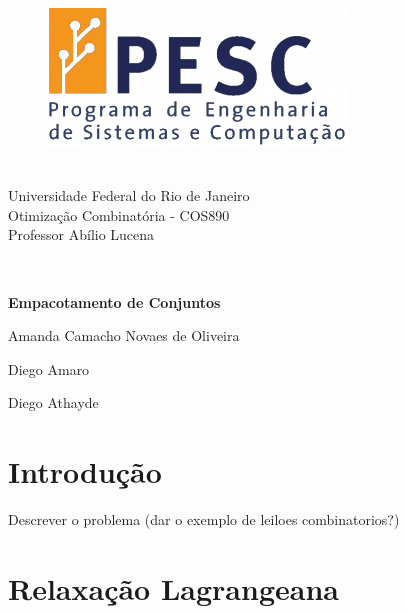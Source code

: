 \documentclass{article}
\begin{document}
	\begin{figure}
		\begin{flushleft}	
			\includegraphics[height=.065\textheight]{PESC.png}
		\end{flushleft}
	\end{figure}
	
	\quad\\
	{Universidade Federal do Rio de Janeiro} \\
	{Otimização Combinatória - COS890} \\
	{Professor Abílio Lucena}
	
	\quad\\
	\vspace*{2cm}
	
	\begin{center}
		\huge\bfseries
		Empacotamento de Conjuntos
	\end{center}
	\vspace*{3mm}
	
	\begin{center}
		\large
		Amanda Camacho Novaes de Oliveira
		
		Diego Amaro	
		
		Diego Athayde 
	\end{center}

	\vspace{1cm}
	
	\section{Introdução}
	Descrever o problema (dar o exemplo de leiloes combinatorios?)
	
	
	
	
	\section{Relaxação Lagrangeana}
	
\end{document}

